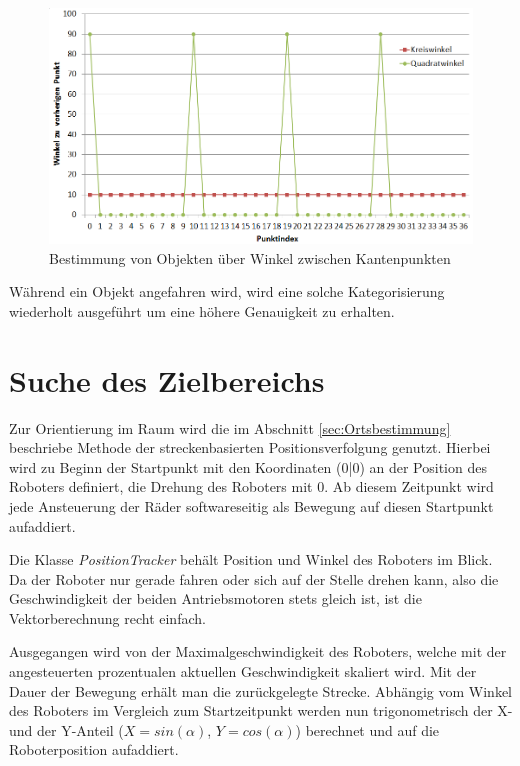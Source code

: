 \begin{figure}[h]
\centering
\includegraphics[width=\textwidth]{Bilder/Workloop/KreisQuadratWinkel}
\caption{Bestimmung von Objekten über Winkel zwischen Kantenpunkten}
\label{fig:KreisQuadratWinkel}
\end{figure}

Während ein Objekt angefahren wird, wird eine solche Kategorisierung wiederholt ausgeführt um eine höhere Genauigkeit zu erhalten.

\section{Suche des Zielbereichs}
\label{sec:Orientierung}

Zur Orientierung im Raum wird die im Abschnitt \ref{sec:Ortsbestimmung} beschriebe Methode der streckenbasierten Positionsverfolgung genutzt. Hierbei wird zu Beginn der Startpunkt mit den Koordinaten (0|0) an der Position des Roboters definiert, die Drehung des Roboters mit 0\degree. Ab diesem Zeitpunkt wird jede Ansteuerung der Räder  softwareseitig als Bewegung auf diesen Startpunkt aufaddiert. 

Die Klasse \textit{PositionTracker} behält Position und Winkel des Roboters im Blick. Da der Roboter nur gerade fahren oder sich auf der Stelle drehen kann, also die Geschwindigkeit der beiden Antriebsmotoren stets gleich ist, ist die Vektorberechnung recht einfach.

Ausgegangen wird von der Maximalgeschwindigkeit des Roboters, welche mit der angesteuerten prozentualen aktuellen Geschwindigkeit skaliert wird. Mit der Dauer der Bewegung erhält man die zurückgelegte Strecke. Abhängig vom Winkel des Roboters im Vergleich zum Startzeitpunkt werden nun trigonometrisch der X- und der Y-Anteil ($X=sin(\alpha)$, $Y=cos(\alpha)$) berechnet und auf die Roboterposition aufaddiert.


